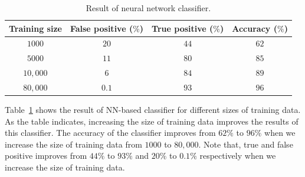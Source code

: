 \begin{table}
\center \caption{Result of neural network classifier.}\label{tab:nn}
\begin{tabular}{|c|c|c|c|}
\hline
 Training size& False positive ($\%$) &True positive ($\%$)&Accuracy ($\%$)\\
      \hline
	$1000$&$20$ &$44 $  & $62$\\
	$5000$&$11$& $80$  & $85$\\
	$10,000$&$6$& $84$  &$ 89$\\
	$80,000$&$0.1$& $93$   & $96$\\%
\hline
\end{tabular}
\end{table}

Table~\ref{tab:nn} shows the result of NN-based classifier for different sizes of training data. As the table indicates, increasing the size of training data improves the results of this classifier. The accuracy of the classifier improves from $62\%$ to $96\%$ when we increase the size of training data from $1000$ to $80,000$. Note that, true and false positive improves from $44\%$ to $93\%$ and $20\%$ to $0.1\%$ respectively when we increase the size of training data.

